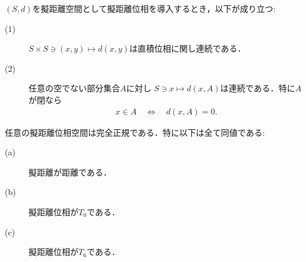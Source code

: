 	\begin{screen}
		\begin{thm}[擬距離関数の連続性]\label{thm:continuity_of_pseudometrics}
			$(S,d)$を擬距離空間として擬距離位相を導入するとき，以下が成り立つ:
			\begin{description}
				\item[(1)] $S \times S \ni (x,y) \longmapsto d(x,y)$は直積位相に関し連続である．
				
				\item[(2)] 任意の空でない部分集合$A$に対し
					$S \ni x \longmapsto d(x,A)$は連続である．特に$A$が閉なら
					\begin{align}
						x \in A \quad \Longleftrightarrow \quad
						d(x,A) = 0. 
					\end{align} 
			\end{description}
		\end{thm}
	\end{screen}
	
	\begin{screen}
		\begin{thm}[擬距離空間は完全正規]
			任意の擬距離位相空間は完全正規である．特に以下は全て同値である:
			\begin{description}
				\item[(a)] 擬距離が距離である．
				\item[(b)] 擬距離位相が$T_0$である．
				\item[(c)] 擬距離位相が$T_6$である．
			\end{description}
		\end{thm}
	\end{screen}
	
